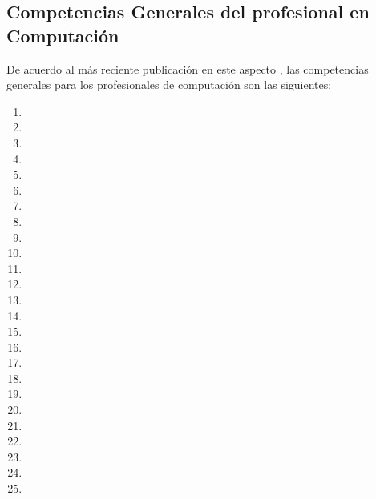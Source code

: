 \subsection{Competencias Generales del profesional en Computación}
De acuerdo al más reciente publicación en este aspecto \cite{IEEECompetences}, las competencias generales para los profesionales de computación son las siguientes:

\begin{enumerate}
\renewcommand{\theenumi}{C\arabic{enumi}}
\item {}
\item {}
\item {}
\item {}
\item {}
\item {}
\item {}
\item {}
\item {}
\item {}
\item {}
\item {}
\item {}
\item {}
\item {}
\item {}
\item {}
\item {}
\item {}
\item {}
\item {}
\item {}
\item {}
\item {}
\item {}
\end{enumerate}